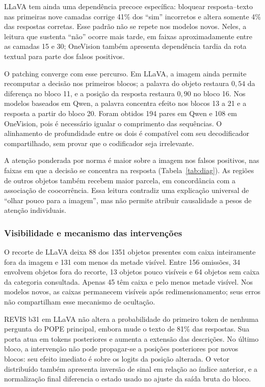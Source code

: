 LLaVA tem ainda uma dependência precoce específica: bloquear resposta--texto nas primeiras nove camadas corrige 41\% dos ``sim'' incorretos e altera somente 4\% das respostas corretas. Esse padrão não se repete nos modelos novos. Neles, a leitura que sustenta ``não'' ocorre mais tarde, em faixas aproximadamente entre as camadas 15 e 30; OneVision também apresenta dependência tardia da rota textual para parte dos falsos positivos.

O patching converge com esse percurso. Em LLaVA, a imagem ainda permite recomputar a decisão nos primeiros blocos; a palavra do objeto restaura $0{,}54$ da diferença no bloco 11, e a posição da resposta restaura $0{,}90$ no bloco 16. Nos modelos baseados em Qwen, a palavra concentra efeito nos blocos 13 a 21 e a resposta a partir do bloco 20. Foram obtidos 194 pares em Qwen e 108 em OneVision, pois é necessário igualar o comprimento das sequências. O alinhamento de profundidade entre os dois é compatível com seu decodificador compartilhado, sem provar que o codificador seja irrelevante.

A atenção ponderada por norma é maior sobre a imagem nos falsos positivos, nas faixas em que a decisão se concentra na resposta (Tabela~\ref{tab:diag}). As regiões de outros objetos também recebem maior parcela, em concordância com a associação de coocorrência. Essa leitura contradiz uma explicação universal de ``olhar pouco para a imagem'', mas não permite atribuir causalidade a pesos de atenção individuais.

\subsubsection{Visibilidade e mecanismo das intervenções}
O recorte de LLaVA deixa 88 dos 1351 objetos presentes com caixa inteiramente fora da imagem e 131 com menos da metade visível. Entre 156 omissões, 34 envolvem objetos fora do recorte, 13 objetos pouco visíveis e 64 objetos sem caixa da categoria consultada. Apenas 45 têm caixa e pelo menos metade visível. Nos modelos novos, as caixas permanecem visíveis após redimensionamento; seus erros não compartilham esse mecanismo de ocultação.

REVIS b31 em LLaVA não altera a probabilidade do primeiro token de nenhuma pergunta do POPE principal, embora mude o texto de 81\% das respostas. Sua porta atua em tokens posteriores e aumenta a extensão das descrições. No último bloco, a intervenção não pode propagar-se a posições posteriores por novos blocos: seu efeito imediato é sobre os logits da posição alterada. O vetor distribuído também apresenta inversão de sinal em relação ao índice anterior, e a normalização final diferencia o estado usado no ajuste da saída bruta do bloco.

